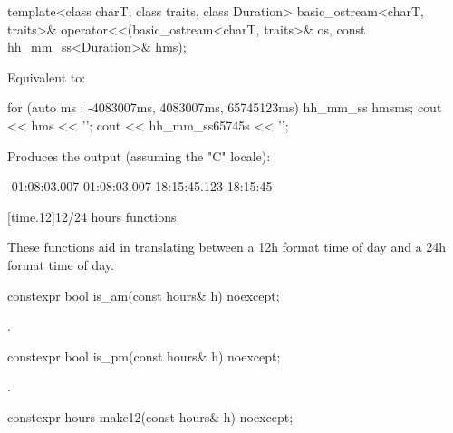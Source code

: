 \begin{itemdecl}
template<class charT, class traits, class Duration>
  basic_ostream<charT, traits>&
    operator<<(basic_ostream<charT, traits>& os, const hh_mm_ss<Duration>& hms);
\end{itemdecl}

\begin{itemdescr}
\pnum
\effects
Equivalent to:

\pnum
\begin{example}
\begin{codeblock}
for (auto ms : {-4083007ms, 4083007ms, 65745123ms}) {
  hh_mm_ss hms{ms};
  cout << hms << '\n';
}
cout << hh_mm_ss{65745s} << '\n';
\end{codeblock}
Produces the output (assuming the "C" locale):
\begin{codeblock}
-01:08:03.007
01:08:03.007
18:15:45.123
18:15:45
\end{codeblock}
\end{example}
\end{itemdescr}

[time.12]{12/24 hours functions}

\pnum
These functions aid in translating between a 12h format time of day
and a 24h format time of day.

%
\begin{itemdecl}
constexpr bool is_am(const hours& h) noexcept;
\end{itemdecl}

\begin{itemdescr}
\pnum
\returns
{}.
\end{itemdescr}

%
\begin{itemdecl}
constexpr bool is_pm(const hours& h) noexcept;
\end{itemdecl}

\begin{itemdescr}
\pnum
\returns
{}.
\end{itemdescr}

%
\begin{itemdecl}
constexpr hours make12(const hours& h) noexcept;
\end{itemdecl}

